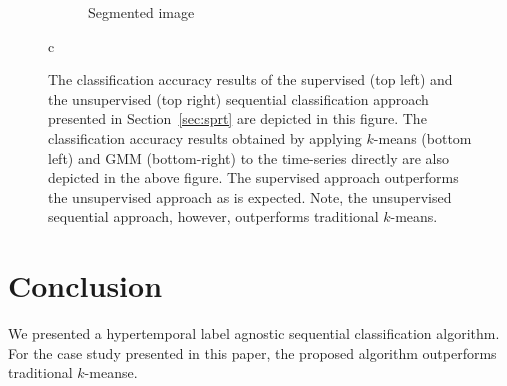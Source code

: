 \documentclass{article}
\begin{document}
\begin{figure}[h]
\begin{subfigure}[b]{0.49\linewidth}
    \caption{Segmented image} 
    \label{fig7:d} 
  \end{subfigure} 
  \caption{c}
  \label{fig7} 
  \caption{The classification accuracy results of the supervised (top left) and the unsupervised (top right) sequential classification approach presented in Section~\ref{sec:sprt} are depicted in this figure. The classification
  accuracy results obtained by applying $k$-means (bottom left) and GMM (bottom-right) to the time-series directly are also depicted in the above figure. The supervised approach outperforms the 
  unsupervised approach as is expected. Note, the unsupervised sequential approach, however, outperforms traditional $k$-means.}
  \label{fig:results}
\end{figure}

\section{Conclusion}
\label{sec:ref}
We presented a hypertemporal label agnostic sequential classification algorithm. For the case study presented in this paper, the proposed algorithm 
outperforms traditional $k$-meanse.




\end{document}

